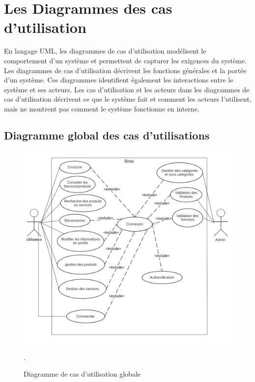 \section{Les Diagrammes des cas d'utilisation }
\par En langage UML, les diagrammes de cas d'utilisation modélisent le comportement d'un système et permettent de capturer les exigences du système. Les diagrammes de cas d'utilisation décrivent les fonctions générales et la portée d'un système. Ces diagrammes identifient également les interactions entre le système et ses acteurs. Les cas d'utilisation et les acteurs dans les diagrammes de cas d'utilisation décrivent ce que le système fait et comment les acteurs l'utilisent, mais ne montrent pas comment le système fonctionne en interne.\cite{ref4}
\subsection{Diagramme global des cas d'utilisations }
\begin{figure}[H]
    \centering
    \includegraphics[scale=0.35]{images/use case/use case global.png}
    \caption{Diagramme de cas d’utilisation globale}.
    \label{fig:my_label}
\end{figure}

